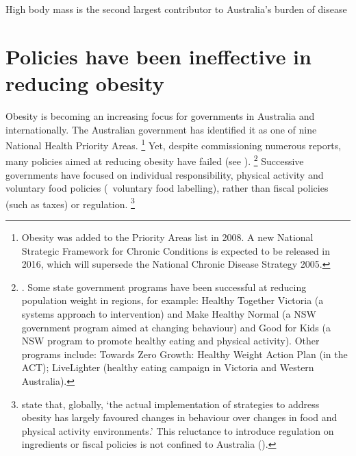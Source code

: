 \documentclass[embargoed]{grattan}
\begin{document}
\begin{table}
\caption{High body mass is the second largest contributor to Australia's burden of disease} \label{tbl:high-body-is-the-2nd-largest-contributor-to-Aust-disease-burden}




\end{table}

\section{Policies have been ineffective in reducing obesity}\label{policies-have-been-ineffective-in-reducing-obesity}

Obesity is becoming an increasing focus for governments in Australia and internationally.
The Australian government has identified it as one of nine National Health Priority Areas.%
\footnote{Obesity was added to the Priority Areas list in 2008.
A new National Strategic Framework for Chronic Conditions is expected to be released in 2016, which will supersede the National Chronic Disease Strategy 2005.} Yet, despite commissioning numerous reports, many policies aimed at reducing obesity have failed (see ).%
\footnote{\textcite{Swinburn2013Progressobesityprevention}.
Some state government programs have been successful at reducing population weight in regions, for example: Healthy Together Victoria (a systems approach to intervention) and Make Healthy Normal (a NSW government program aimed at changing behaviour) and Good for Kids (a NSW program to promote healthy eating and physical activity). Other programs include: Towards Zero Growth: Healthy Weight Action Plan (in the ACT); LiveLighter (healthy eating campaign in Victoria and Western Australia).} Successive governments have focused on individual responsibility, physical activity and voluntary food policies (\eg~voluntary food labelling), rather than fiscal policies (such as taxes) or regulation.%
\footnote{\textcite{Roberto2015Patchyprogressobesity} state that, globally, `the actual implementation of strategies to address obesity has largely favoured changes in behaviour over changes in food and physical activity environments.' This reluctance to introduce regulation on ingredients or fiscal policies is not confined to Australia (\textcites{Swinburn2013Progressobesityprevention}{Capacci2012Policiespromotehealthy}).}
\end{document}
